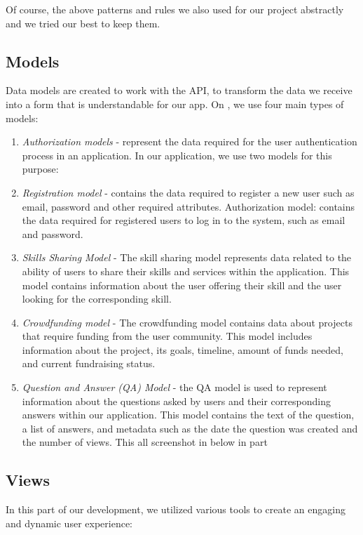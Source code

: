 Of course, the above patterns and rules we also used for our project abstractly and we tried our best to keep them.

\subsection{Models}\label{modls}
Data models are created to work with the API, to transform the data we receive into a form that is understandable for our app. On , we use four main types of models:
\begin{enumerate}
    \item \textit{Authorization models} - represent the data required for the user authentication process in an application. In our application, we use two models for this purpose: 
    \item \textit{Registration model} - contains the data required to register a new user such as email, password and other required attributes. Authorization model: contains the data required for registered users to log in to the system, such as email and password.
    \item \textit{Skills Sharing Model} -  The skill sharing model represents data related to the ability of users to share their skills and services within the application. This model contains information about the user offering their skill and the user looking for the corresponding skill.
    \item \textit{Crowdfunding model} - The crowdfunding model contains data about projects that require funding from the user community. This model includes information about the project, its goals, timeline, amount of funds needed, and current fundraising status.
    \item \textit{Question and Answer (QA) Model} - the QA model is used to represent information about the questions asked by users and their corresponding answers within our application. This model contains the text of the question, a list of answers, and metadata such as the date the question was created and the number of views. This all screenshot in below in  part
\end{enumerate}

\subsection{Views}\label{views}
In this part of our development, we utilized various  tools to create an engaging and dynamic user experience:

